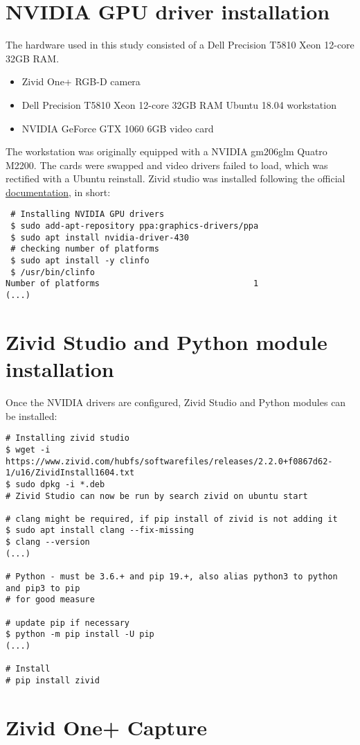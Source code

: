 \section{NVIDIA GPU driver installation}

The hardware used in this study consisted of a Dell Precision T5810 Xeon 12-core 32GB RAM.
\begin{itemize}
    \item Zivid One+ RGB-D camera
    \item Dell Precision T5810 Xeon 12-core 32GB RAM Ubuntu 18.04 workstation
    \item NVIDIA GeForce GTX 1060 6GB video card
\end{itemize}

The workstation was originally equipped with a NVIDIA gm206glm Quatro M2200. The cards were swapped and video drivers failed to load, which was rectified with a Ubuntu reinstall.
Zivid studio was installed following the official \href{https://zivid.atlassian.net/wiki/spaces/ZividKB/pages/59080712/Zivid+Software+Installation}{documentation}, in short:
\begin{verbatim}
 # Installing NVIDIA GPU drivers
 $ sudo add-apt-repository ppa:graphics-drivers/ppa
 $ sudo apt install nvidia-driver-430
 # checking number of platforms
 $ sudo apt install -y clinfo
 $ /usr/bin/clinfo
Number of platforms                               1
(...)
\end{verbatim}

\section{Zivid Studio and Python module installation}
Once the NVIDIA drivers are configured, Zivid Studio and Python modules can be installed:
\begin{verbatim}
# Installing zivid studio
$ wget -i https://www.zivid.com/hubfs/softwarefiles/releases/2.2.0+f0867d62-1/u16/ZividInstall1604.txt
$ sudo dpkg -i *.deb
# Zivid Studio can now be run by search zivid on ubuntu start 

# clang might be required, if pip install of zivid is not adding it
$ sudo apt install clang --fix-missing
$ clang --version
(...)

# Python - must be 3.6.+ and pip 19.+, also alias python3 to python and pip3 to pip 
# for good measure

# update pip if necessary
$ python -m pip install -U pip
(...)

# Install
# pip install zivid    
\end{verbatim}

\section{Zivid One+ Capture}






